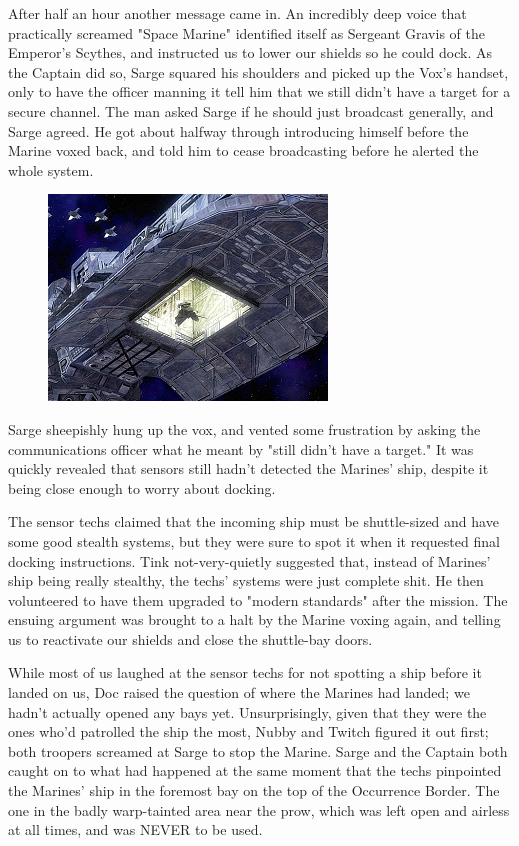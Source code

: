After half an hour another message came in. 
An incredibly deep voice that practically screamed "Space Marine" identified itself as Sergeant Gravis of the Emperor's Scythes, and instructed us to lower our shields so he could dock. 
As the Captain did so, Sarge squared his shoulders and picked up the Vox's handset, only to have the officer manning it tell him that we still didn't have a target for a secure channel. 
The man asked Sarge if he should just broadcast generally, and Sarge agreed. 
He got about halfway through introducing himself before the Marine voxed back, and told him to cease broadcasting before he alerted the whole system.
\begin{figure}
	\begin{center}
		\includegraphics[width=\figwidth]{pics/12/15.png}
	\end{center}
\end{figure}
Sarge sheepishly hung up the vox, and vented some frustration by asking the communications officer what he meant by "still didn't have a target." It was quickly revealed that sensors still hadn't detected the Marines' ship, despite it being close enough to worry about docking. 


The sensor techs claimed that the incoming ship must be shuttle-sized and have some good stealth systems, but they were sure to spot it when it requested final docking instructions. 
Tink not-very-quietly suggested that, instead of Marines' ship being really stealthy, the techs' systems were just complete shit. 
He then volunteered to have them upgraded to "modern standards" after the mission. 
The ensuing argument was brought to a halt by the Marine voxing again, and telling us to reactivate our shields and close the shuttle-bay doors.

While most of us laughed at the sensor techs for not spotting a ship before it landed on us, Doc raised the question of where the Marines had landed; 
we hadn't actually opened any bays yet. 
Unsurprisingly, given that they were the ones who'd patrolled the ship the most, Nubby and Twitch figured it out first; 
both troopers screamed at Sarge to stop the Marine. 
Sarge and the Captain both caught on to what had happened at the same moment that the techs pinpointed the Marines' ship in the foremost bay on the top of the Occurrence Border. 
The one in the badly warp-tainted area near the prow, which was left open and airless at all times, and was NEVER to be used.

